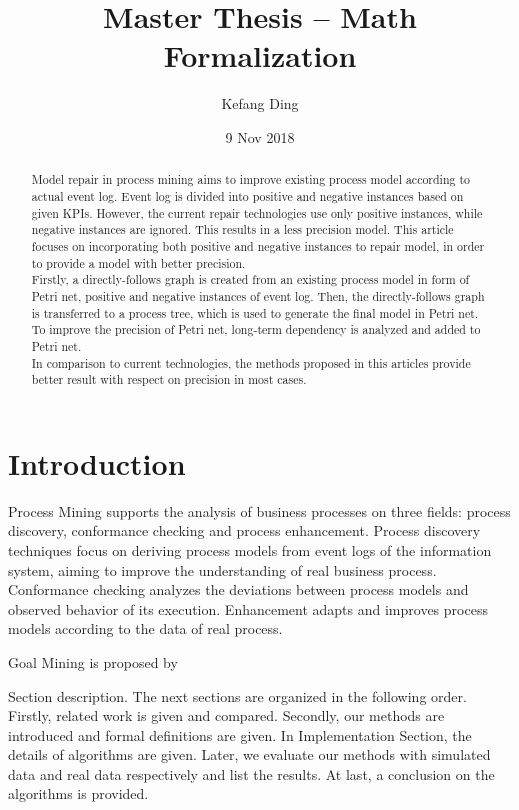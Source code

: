 \documentclass[]{article}
\title{Master Thesis --  Math Formalization}
\author{Kefang Ding}
\date{9 Nov 2018}
\begin{document}
\maketitle
\hrulefill
\begin{abstract}
Model repair in process mining aims to improve existing process model according to actual event log. Event log is divided into positive and negative instances based on given KPIs. However, the current repair technologies use only positive instances, while negative instances are ignored. This results in a  less precision model. This article focuses on incorporating both positive and negative instances to repair model, in order to provide a model with better precision. 
\\
Firstly, a directly-follows graph is created from an existing process model in form of Petri net,  positive and negative instances of event log. Then, the directly-follows graph is transferred to a process tree, which is used to generate the final model in Petri net. To improve the precision of Petri net, long-term dependency is analyzed and added to Petri net. 
\\ 
In comparison to current technologies, the methods proposed in this articles provide better result with respect on precision in most cases. 
\end{abstract}
\pagebreak
\section{Introduction}
Process Mining supports the analysis of business processes on three fields: process discovery, conformance checking and process enhancement\cite{van2011process}. Process discovery techniques focus on deriving process models from event logs of the information system, aiming to improve the understanding of real business process. Conformance checking analyzes the deviations between process models and observed behavior of its execution. Enhancement adapts and improves process models according to the data of real process.

Goal Mining is proposed by 

Section description. The next sections are organized in the following order. Firstly, related work is given and compared. Secondly, our methods are introduced and formal definitions are given. In Implementation Section, the details of algorithms are given. Later, we evaluate our methods with simulated data and real data respectively and list the results. At last, a conclusion on the algorithms is provided. 
\end{document}
